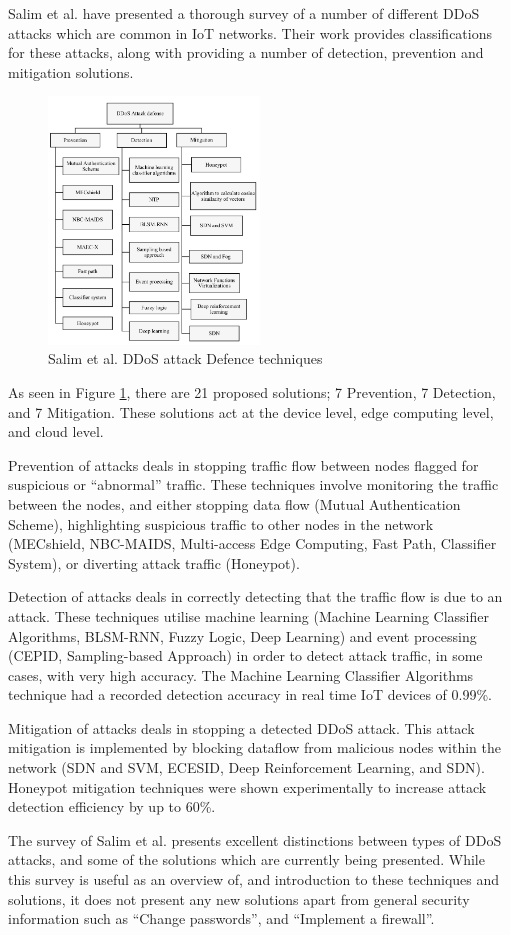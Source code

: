 Salim et al.\cite{Salim2019} have presented a thorough survey of a number of different DDoS
attacks which are common in IoT networks. Their work provides classifications
for these attacks, along with providing a number of detection, prevention and
mitigation solutions.

\begin{figure}[H]
	\centering
	\includegraphics[width=0.5\textwidth]{images/salimDefenseDiagram.png}
	\caption{Salim et al. DDoS attack Defence techniques\cite{Salim2019}}
	\label{fig:salimDefense}
\end{figure}

As seen in Figure \ref{fig:salimDefense}, there are 21 proposed solutions; 7
Prevention, 7 Detection, and 7 Mitigation. These solutions act at the device
level, edge computing level, and cloud level.

Prevention of attacks deals in stopping traffic flow between nodes flagged for
suspicious or ``abnormal'' traffic. These techniques involve
monitoring the traffic between the nodes, and either stopping data flow (Mutual
Authentication Scheme), highlighting suspicious traffic to other nodes in the
network (MECshield, NBC-MAIDS, Multi-access Edge Computing, Fast Path,
Classifier System), or diverting attack traffic (Honeypot).

Detection of attacks deals in correctly detecting that the traffic flow is due
to an attack. These techniques utilise machine learning (Machine Learning
Classifier Algorithms, BLSM-RNN, Fuzzy Logic, Deep Learning) and event processing
(CEPID, Sampling-based Approach) in order to detect attack traffic, in some
cases, with very high accuracy. The Machine Learning Classifier Algorithms
technique had a recorded detection accuracy in real time IoT devices of 0.99\%.

Mitigation of attacks deals in stopping a detected DDoS attack. This attack
mitigation is implemented by blocking dataflow from malicious nodes within the
network (SDN and SVM, ECESID, Deep Reinforcement Learning, and SDN). Honeypot
mitigation techniques were shown experimentally to increase attack detection
efficiency by up to 60\%.

The survey of Salim et al.\cite{Salim2019} presents excellent distinctions
between types of DDoS attacks, and some of the solutions which are currently
being presented. While this survey is useful as an overview of, and introduction
to these techniques and solutions, it does not present any new solutions apart
from general security information such as ``Change passwords'', and ``Implement
a firewall''.
